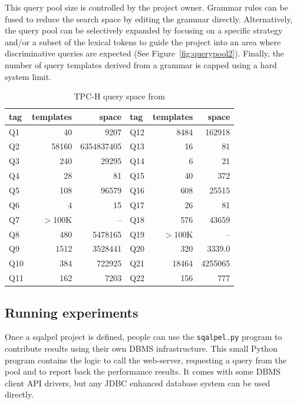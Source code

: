 \documentclass{cidr-2019}
\begin{document}

This query pool size is controlled by the project owner. Grammar rules can be
fused to reduce the search space by editing the grammar directly.
Alternatively, the query pool can be selectively expanded by focusing
on a specific strategy and/or a subset of the lexical tokens to guide
the project into an area where discriminative queries are expected
(See Figure~\ref{fig:querypool2}). Finally, the number of query
templates derived from a grammar is capped using a hard system limit.
\begin{table}[t]
{\small \begin{tabular}{ | l r r | l r r |}\hline tag & templates &
    space & tag & templates & space\\\hline Q1 & 40 & 9207 & Q12 &
    8484 & 162918 \\ Q2 & 58160 & 6354837405 & Q13 & 16 & 81\\ Q3 &
    240 & 29295 & Q14 & 6 & 21\\ Q4 & 28 & 81 & Q15 & 40 & 372 \\ Q5 &
    108 & 96579 & Q16 & 608 & 25515\\ Q6 & 4 & 15 & Q17 & 26 & 81
    \\ Q7 & $>$100K & -- & Q18 & 576 & 43659\\ Q8 & 480 & 5478165 &
    Q19 & $>$100K & --\\ Q9 & 1512 & 3528441 & Q20 & 320 &
    3339.0\\ Q10 & 384 & 722925 & Q21 & 18464 & 4255065 \\ Q11 & 162 &
    7203 & Q22 & 156& 777\\ \hline
	\end{tabular}
	\caption{TPC-H query space from
          \cite{DBLP:conf/sigmod/KerstenKZ18}\label{table:tpch-count}}}
\end{table}

\subsection{Running experiments}

Once a {\sc sqalpel} project is defined, people can use the 
{\tt sqalpel.py} program to contribute results
using their own DBMS infrastructure.
This small Python program contains the logic to call the
web-server, requesting a query from the pool and to report back the
performance results. It comes with some DBMS client API drivers, but
any JDBC enhanced database system can be used directly.
\end{document}
